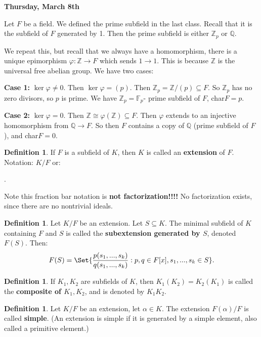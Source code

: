\documentclass[9pt,reqno,twoside]{amsbook}
\theoremstyle{plain}
\numberwithin{section}{chapter}
\numberwithin{equation}{chapter}
\theoremstyle{definition}
\newtheorem{Def}[theorem]{Definition}
\theoremstyle{remark}
\theoremstyle{plain}
\newcommand{\sub}{\subseteq}
\newcommand{\z}{\mathbb{Z}}
\newcommand{\Q}{\mathbb{Q}}
\newcommand{\fracc}{\frac}
\renewcommand{\phi}{\varphi}
\begin{document}
\textbf{Thursday, March 8th}

Let $F$ be a field. We defined the prime subfield in the last class. Recall that it is the subfield of $F$ generated by 1. Then the prime subfield is either $\z_p$ or $\Q$. 

We repeat this, but recall that we always have a homomorphism, there is a unique epimorphism $\phi:\z \to F$ which sends $1 \to 1$. This is because $\z$ is the universal free abelian group. We have two cases:

\textbf{Case 1: } $\ker \phi \neq 0$. Then $\ker \phi = (p)$. Then $\z_p = \z/(p) \sub F$. So $\z_p$ has no zero divisors, so $p$ is prime. We have $\z_p = \mathbb{F}_p$- prime subfield of $F$, char$F = p$. 

\textbf{Case 2: }$\ker\phi = 0$. Then $\z \cong \phi(\z) \sub F$. Then $\phi$ extends to an injective homomorphism from $\Q \to F$. So then $F$ contains a copy of $\Q$ (prime subfield of $F$), and char$F = 0$. 

\begin{Def}
If $F$ is a subfield of $K$, then $K$ is called an \textbf{extension} of $F$. Notation: $K/F$ or:
\begin{center}
.
\end{center}
Note this fraction bar notation is \textbf{not factorization!!!!} No factorization exists, since there are no nontrivial ideals. 
\end{Def}

\begin{Def}
Let $K/F$ be an extension. Let $S \sub K$. The minimal subfield of $K$ containing $F$ and $S$ is called the \textbf{subextension generated by $S$}, denoted $F(S)$. Then:
$$
F(S) = \Set{\fracc{p(s_1,...,s_k)}{q(s_1,...,s_k)}: p,q \in F[x], s_1,...,s_k \in S}. 
$$
\end{Def}

\begin{Def}
If $K_1,K_2$ are subfields of $K$, then $K_1(K_2) = K_2(K_1)$ is called the \textbf{composite of $K_1,K_2$}, and is denoted by $K_1K_2$. 
\end{Def}

\begin{Def}
Let $K/F$ be an extension, let $\alpha \in K$. The extension $F(\alpha)/F$ is called \textbf{simple}. (An extension is simple if it is generated by a simple element, also called a primitive element.)
\end{Def}
\end{document}
